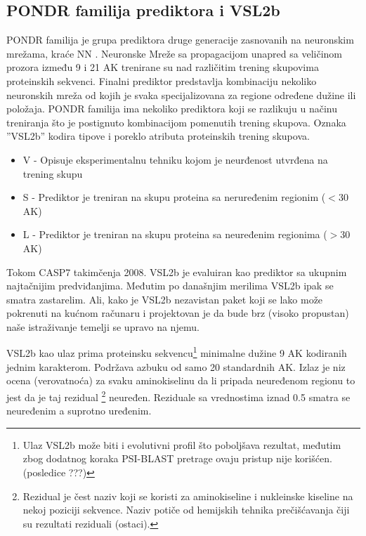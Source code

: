\subsection{PONDR familija prediktora i VSL2b}
\label{VSL2b}

PONDR familija  je grupa
prediktora druge generacije zasnovanih na neuronskim mrežama, kraće NN .
Neuronske Mreže sa propagacijom unapred  sa veličinom
prozora između 9 i 21 AK trenirane su nad različitim trening skupovima
proteinskih sekvenci.  Finalni prediktor predstavlja kombinaciju nekoliko
neuronskih mreža od kojih je svaka specijalizovana za regione određene dužine
ili položaja.  PONDR familija ima nekoliko prediktora koji  se razlikuju u
načinu treniranja što je postignuto kombinacijom pomenutih trening skupova.
Oznaka ''VSL2b'' kodira tipove i poreklo atributa proteinskih trening skupova.
\begin{itemize}
  \item V - Opisuje eksperimentalnu tehniku kojom je neurđenost utvrđena na
    trening skupu 
  \item S - Prediktor je treniran na skupu proteina sa 
      neruređenim regionim ($<30$ AK)
  \item L - Prediktor je treniran na skupu proteina sa 
    neuređenim regionima ($>30$ AK)
\end{itemize}

Tokom CASP7 takimčenja 2008. VSL2b je evaluiran kao prediktor sa ukupnim
najtačnijim predviđanjima\parencite{bohe2009}. Međutim po današnjim merilima
\parencite{meng2017} VSL2b ipak se smatra zastarelim.  Ali, kako je VSL2b
nezavistan paket koji se lako može pokrenuti na kućnom računaru i projektovan
je da bude brz (visoko propustan) naše istraživanje temelji se upravo na njemu.

VSL2b kao ulaz prima proteinsku sekvencu\footnote{
Ulaz VSL2b može biti i evolutivni profil što poboljšava rezultat,  međutim zbog
dodatnog koraka PSI-BLAST pretrage ovaju pristup nije korišćen.
(posledice ???)
}
minimalne dužine 9 AK kodiranih jednim
karakterom. Podržava azbuku od samo 20 standardnih AK.  Izlaz je niz
ocena (verovatnoća) za svaku aminokiselinu da li pripada neuređenom regionu to
jest da je taj rezidual
\footnote{ Rezidual je čest naziv koji se koristi za aminokiseline i nukleinske
  kiseline na nekoj poziciji sekvence.  Naziv potiče od hemijskih tehnika
  prečišćavanja čiji su rezultati reziduali (ostaci).
} neuređen. Reziduale sa vrednostima iznad 0.5 smatra se neuređenim a suprotno
uređenim.





